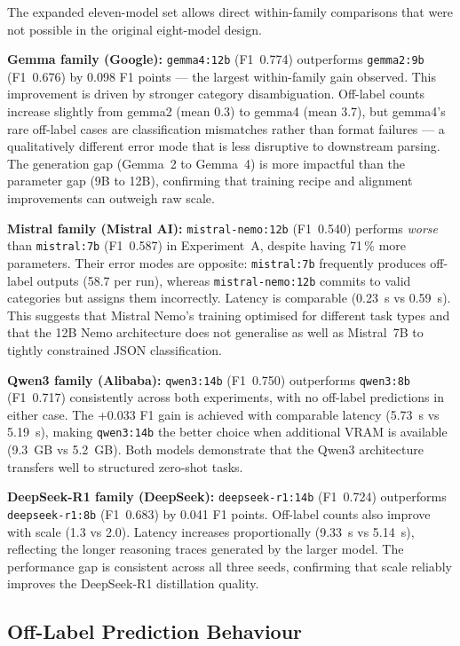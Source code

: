 \documentclass[a4paper,fleqn]{cas-dc}
\begin{document}
The expanded eleven-model set allows direct within-family comparisons
that were not possible in the original eight-model design.

\textbf{Gemma family (Google):} \texttt{gemma4:12b} (F1~0.774)
outperforms \texttt{gemma2:9b} (F1~0.676) by 0.098 F1 points ---
the largest within-family gain observed. This improvement is driven by
stronger category disambiguation.
Off-label counts increase slightly from gemma2 (mean 0.3) to
gemma4 (mean 3.7), but gemma4's rare off-label cases are
classification mismatches rather than format failures ---
a qualitatively different error mode that is less disruptive
to downstream parsing. The generation gap (Gemma~2 to
Gemma~4) is more impactful than the parameter gap (9B to 12B),
confirming that training recipe and alignment improvements can
outweigh raw scale.

\textbf{Mistral family (Mistral AI):} \texttt{mistral-nemo:12b}
(F1~0.540) performs \emph{worse} than \texttt{mistral:7b} (F1~0.587)
in Experiment~A, despite having 71\,\% more parameters. Their
error modes are opposite: \texttt{mistral:7b} frequently produces
off-label outputs (58.7 per run), whereas \texttt{mistral-nemo:12b}
commits to valid categories but assigns them incorrectly.
Latency is comparable (0.23~s vs 0.59~s). This suggests that Mistral
Nemo's training optimised for different task types and that the
12B Nemo architecture does not generalise as well as Mistral~7B to
tightly constrained JSON classification.

\textbf{Qwen3 family (Alibaba):} \texttt{qwen3:14b} (F1~0.750)
outperforms \texttt{qwen3:8b} (F1~0.717) consistently across both
experiments, with no off-label predictions in either case. The
+0.033 F1 gain is achieved with comparable latency (5.73~s vs 5.19~s),
making \texttt{qwen3:14b} the better choice when additional VRAM is
available (9.3~GB vs 5.2~GB). Both models demonstrate that the Qwen3
architecture transfers well to structured zero-shot tasks.

\textbf{DeepSeek-R1 family (DeepSeek):} \texttt{deepseek-r1:14b}
(F1~0.724) outperforms \texttt{deepseek-r1:8b} (F1~0.683) by 0.041
F1 points. Off-label counts also improve with scale (1.3 vs 2.0).
Latency increases proportionally (9.33~s vs 5.14~s), reflecting
the longer reasoning traces generated by the larger model. The
performance gap is consistent across all three seeds, confirming
that scale reliably improves the DeepSeek-R1 distillation quality.

\subsection{Off-Label Prediction Behaviour}
\end{document}
